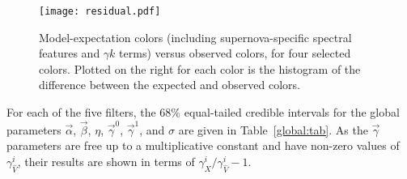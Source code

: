 \documentclass{aastex61}   	%
\begin{document}
\begin{figure}[htbp] %
   \centering
   \texttt{[image: residual.pdf]} 
            \caption{
            \color{red}
            Model-expectation colors (including  supernova-specific spectral features and $\gamma k$ terms)
            versus observed colors, for four selected colors. 
            \color{black}
            Plotted on the right for each color
is the histogram of the difference between the expected and
observed
 colors. 
            \label{residual:fig}}
\end{figure}


For each of the five filters, the 68\%  equal-tailed credible intervals for the global parameters $\vec{\alpha}$, $\vec{\beta}$, $\eta$, $\vec{\gamma}^0$, $\vec{\gamma}^1$, and $\sigma$
are given in Table~\ref{global:tab}.
As the $\vec{\gamma}$ parameters are free up to a multiplicative constant and have non-zero values of $\gamma^i_{\hat{V}}$,
their results are shown in terms of $\gamma^i_X/\gamma^i_{\hat{V}}-1$.
\end{document}
